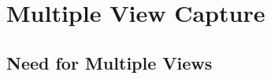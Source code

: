  \vspace{.5em}




\section{Multiple View Capture}
\label{sec:mvcap}



\subsection{Need for Multiple Views}


